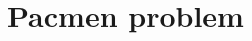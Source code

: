 \documentclass[journal]{IEEEtran}
\begin{document}
\section{Pacmen problem}

\subsection{}

\subsection{}

\subsection{}

\subsection{}

\subsection{}

\subsection{}

\subsection{}
\end{document}
